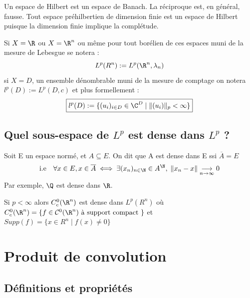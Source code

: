 \begin{remark}
    Un espace de Hilbert est un espace de Banach. La réciproque est, en général, fausse. 
    Tout espace préhilbertien de dimension finie est un espace de Hilbert puisque la dimension finie implique la complétude. 
\end{remark}

\begin{example}
    Si $X = \R$ ou $X = \R^n$ ou même pour tout borélien de ces espaces muni de la mesure de Lebesgue se notera :
        \[ L^p(R^n) := L^p(\R^n, \lambda_n) \] 
    si $X = D$, un ensemble dénombrable muni de la mesure de comptage on notera $l^p(D) := L^p(D,c)$ et plus formellement :
        \[ \boxed{ l^p(D) := \{ (u_i)_{i \in D} \in \C^D \; | \; \|(u_i)\|_p < \infty \} }\] 
\end{example}

\newpage

\subsection{Quel sous-espace de $L^p$ est dense dans $L^p$ ?}

\begin{remark}
    Soit E un espace normé, et $A \subseteq E$. 
    On dit que A est dense dans E ssi $\overline{A} = E$ 
    \[ \text{i.e} \quad 
        \forall x \in E, x \in \overline{A} \; 
        \Longleftrightarrow \; \exists (x_n)_{n \in \N} \in A^\N, \; \| x_n - x \| \underset{n \to \infty}{\longrightarrow} 0 
    \] 
    Par exemple, $\Q$ est dense dans $\R$. 
\end{remark}

\begin{theorem}
    Si $p < \infty$ alors $C^0_c(\R^n)$ est dense dans $L^p(R^n)$ 
    où $C^0_c(\R^n) = \{f \in \mathcal{C}^0(\R^n) \text{ à support compact }\} $ 
    et $ Supp(f) = \{x \in R^n \; | \; f(x) \not = 0\}$ 
\end{theorem}


\section{Produit de convolution}

\subsection{Définitions et propriétés}

